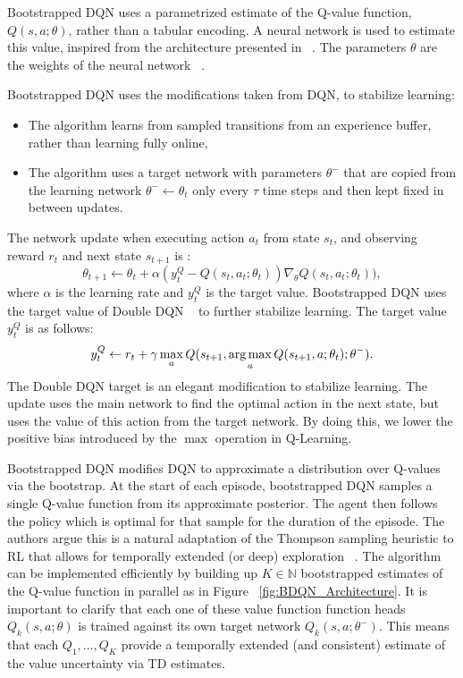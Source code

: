 Bootstrapped DQN uses a parametrized estimate of the Q-value function, $Q(s,a;\theta)$, rather than a tabular encoding. A neural network is used to estimate this value, inspired from the architecture presented in ~\cite{mnih2015humanlevel}. The parameters $\theta$ are the weights of the neural network ~\cite{Goodfellow-et-al-2016}.\par
Bootstrapped DQN uses the modifications taken from DQN, to stabilize learning:
\begin{itemize}
\item The algorithm learns from sampled transitions from an experience buffer, rather than learning fully online,
\item The algorithm uses a target network with parameters $\theta^-$ that are copied from the learning network $\theta^- \leftarrow \theta_t$ only every $\tau$ time steps and then kept fixed in between updates.
\end{itemize}
The network update when executing action $a_t$ from state $s_t$, and observing reward $r_t$ and next state $s_{t+1}$ is :
\begin{equation}
\theta_{t+1} \leftarrow \theta_t +\alpha(y^Q_t-Q(s_t,a_t;\theta_t)) \nabla_{\theta} Q(s_t,a_t;\theta_t)),
\end{equation}
 where $\alpha$ is the learning rate and $y^Q_t$ is the target value. Bootstrapped DQN uses the target value of Double DQN ~\cite{Goodfellow-et-al-2016} to further stabilize learning. The target value $y^Q_t$ is as follows:
 \begin{equation}
 \label{eq:double_DQN_target}
 y^Q_t\leftarrow r_t+ \gamma \max_a Q(s_{t+1}, \operatorname*{arg\,max}_{a} Q(s_{t+1},a;\theta_t);\theta^-).
 \end{equation}
 The Double DQN target is an elegant modification to stabilize learning. The update uses the main network to find the optimal action in the next state, but uses the value of this action from the target network. By doing this, we lower the positive bias introduced by the $\max$ operation in Q-Learning.\par
Bootstrapped DQN modifies DQN to approximate a distribution over Q-values via the bootstrap. At the start of each episode, bootstrapped DQN samples a single Q-value function from its approximate posterior. The agent then follows the policy which is optimal for that sample for the duration of the episode. The authors argue this is a natural adaptation of the Thompson sampling heuristic to RL that allows for temporally extended (or deep) exploration ~\cite{Strens00abayesian,NIPS2013_5185}. The algorithm can be implemented efficiently by building up $K \in \mathbb{N}$ bootstrapped estimates of the Q-value function in parallel as in Figure ~\ref{fig:BDQN_Architecture}. It is important to clarify that each one of these value function function heads $Q_k(s,a;\theta)$ is trained against its own target network $Q_k(s,a;\theta^-)$. This means that each $Q_1, \ldots, Q_K$ provide a temporally extended (and consistent) estimate of the value uncertainty via TD estimates. \par 
